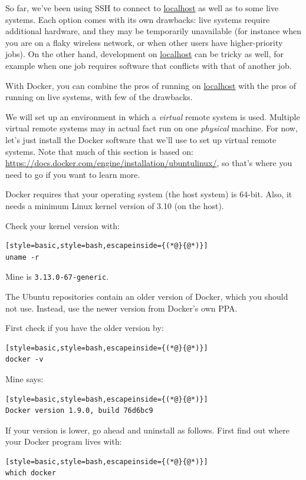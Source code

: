 \documentclass[12pt, a4paper, twoside, openany, titlepage]{book}
\begin{document}
\label{sec:docker}



So far, we've been using SSH to connect to \url{localhost} as well as to some live systems. Each option comes with its own drawbacks: live systems require additional hardware, and they may be temporarily unavailable (for instance when you are on a flaky wireless network, or when other users have higher-priority jobs). On the other hand, development on \url{localhost} can be tricky as well, for example when one job requires software that conflicts with that of another job.

With Docker, you can combine the pros of running on \url{localhost} with the pros of running on live systems, with few of the drawbacks.

We will set up an environment in which a \textit{virtual} remote system is used. Multiple virtual remote systems may in actual fact run on one \textit{physical} machine. For now, let's just install the Docker software that we'll use to set up virtual remote systems. Note that much of this section is based on: \url{https://docs.docker.com/engine/installation/ubuntulinux/}, so that's where you need to go if you want to learn more.

Docker requires that your operating system (the host system) is 64-bit. Also, it needs a minimum Linux kernel version of 3.10 (on the host).

Check your kernel version with:
\begin{lstlisting}[style=basic,style=bash,escapeinside={(*@}{@*)}]
uname -r
\end{lstlisting}
Mine is \texttt{3.13.0-67-generic}.

The Ubuntu repositories contain an older version of Docker, which you should not use. Instead, use the newer version from Docker's own PPA.

First check if you have the older version by:
\begin{lstlisting}[style=basic,style=bash,escapeinside={(*@}{@*)}]
docker -v
\end{lstlisting}
Mine says:
\begin{lstlisting}[style=basic,style=bash,escapeinside={(*@}{@*)}]
Docker version 1.9.0, build 76d6bc9
\end{lstlisting}

If your version is lower, go ahead and uninstall as follows. First find out where your Docker program lives with:
\begin{lstlisting}[style=basic,style=bash,escapeinside={(*@}{@*)}]
which docker
\end{lstlisting}
\end{document}
